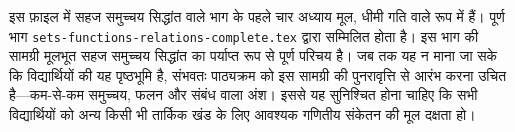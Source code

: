 \documentclass[../../include/open-logic-part]{subfiles}
\begin{document}

\begin{editorial}
  इस फ़ाइल में सहज समुच्चय सिद्धांत वाले भाग के पहले चार अध्याय मूल, धीमी गति
  वाले रूप में हैं। पूर्ण भाग \verb|sets-functions-relations-complete.tex|
  द्वारा सम्मिलित होता है। इस भाग की सामग्री मूलभूत सहज समुच्चय सिद्धांत का
  पर्याप्त रूप से पूर्ण परिचय है। जब तक यह न माना जा सके कि विद्यार्थियों की
  यह पृष्ठभूमि है, संभवतः पाठ्यक्रम को इस सामग्री की पुनरावृत्ति से आरंभ करना
  उचित है---कम-से-कम समुच्चय, फलन और संबंध वाला अंश। इससे यह सुनिश्चित होना
  चाहिए कि सभी विद्यार्थियों को अन्य किसी भी तार्किक खंड के लिए आवश्यक
  गणितीय संकेतन की मूल दक्षता हो।
\end{editorial}





\OLEndPartHook
\end{document}

